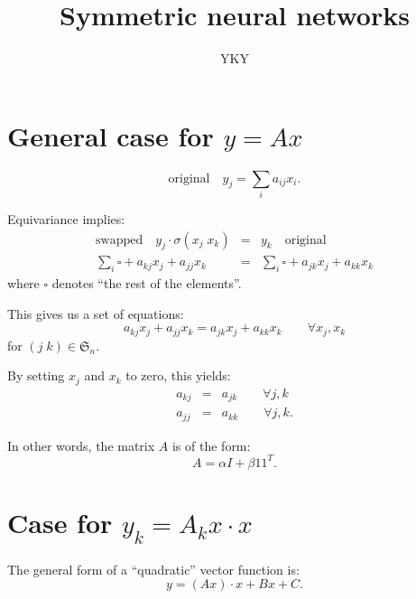 

\title{Symmetric neural networks}
\author{YKY}


\maketitle

\section{General case for $y = A x$}

\begin{equation}
\boxed{\mbox{original}} \quad y_j = \sum_i a_{ij} x_i .
\end{equation}

Equivariance implies:
\begin{eqnarray}
\boxed{\mbox{swapped}} \quad y_j \cdot \sigma(x_j \; x_k) &=& y_k \quad \boxed{\mbox{original}} \\
\sum_i \square + a_{kj} x_j + a_{jj} x_k &=& \sum_i \square + a_{jk} x_j + a_{kk} x_k \nonumber
\end{eqnarray}
where $\square$ denotes ``the rest of the elements''.

This gives us a set of equations:
\begin{equation}
a_{kj} x_j + a_{jj} x_k = a_{jk} x_j + a_{kk} x_k \quad \quad \forall x_j, x_k
\end{equation}
for $(j \; k) \in \mathfrak{S}_n$.

By setting $x_j$ and $x_k$ to zero, this yields:
\begin{eqnarray}
a_{kj} &=& a_{jk} \quad \quad \forall j, k \nonumber \\
a_{jj} &=& a_{kk} \quad \quad \forall j, k .
\end{eqnarray}

In other words, the matrix $A$ is of the form:
\begin{equation}
A = \alpha I + \beta 1 1^T .
\end{equation}

\section{Case for $y_k = A_k x \cdot x$}

The general form of a ``quadratic'' vector function is:
\begin{equation}
y = (A x) \cdot x + B x + C .
\end{equation}

